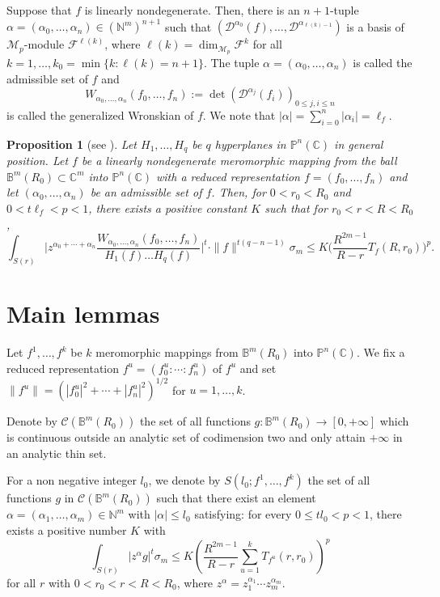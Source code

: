 \documentclass[12pt, a4paper, oneside]{amsart}
\newtheorem{proposition}[equation]{Proposition}
\newcommand{\C}{{\mathbb{C}}}
\newcommand{\N}{\mathbb{N}}
\newcommand{\B}{\mathbb{B}}
\renewcommand{\P}{{\mathbb{P}}}
\numberwithin{equation}{section}
\begin{document}
Suppose that $f$ is linearly nondegenerate. Then, there is an $n+1$-tuple $\alpha=(\alpha_0,\ldots,\alpha_n)\in (\mathbb N^m)^{n+1}$ such that $(\mathcal D^{\alpha_0}(f),\ldots,\mathcal D^{\alpha_{\ell (k)-1}})$ is a basis of $\mathcal M_p$-module $\mathcal F^{\ell (k)}$, where $\ell (k)=\dim_{\mathcal M_p}\mathcal F^{k}$ for all $k=1,\ldots,k_0=\min\{k:\ell (k)=n+1\}$. The tuple $\alpha=(\alpha_0,\ldots,\alpha_n)$ is called the admissible set of $f$ and 
$$W_{\alpha_0,\ldots ,\alpha_n}(f_0,\ldots ,f_n):=\det (\mathcal D^{\alpha_j}(f_i))_{0\le j,i\le n}$$ 
is called the generalized Wronskian of $f$. We note that $|\alpha|=\sum_{i=0}^n|\alpha_i|=\ell_f.$
\begin{proposition}[{see \cite[Proposition 2.12]{Fu86}}]\label{2.1}
 Let $H_1,\ldots ,H_q$ be $q$ hyperplanes in $\P^n(\C)$ in general position. Let $f$ be a linearly nondegenerate meromorphic mapping from the ball $\B^m(R_0)\subset\C^m$ into $\P^{n}(\C)$ with a reduced representation $f=(f_0,\ldots ,f_{n})$ and let $(\alpha_0,\ldots ,\alpha_n)$ be an admissible set of $f$. Then, for $0 < r_0 < R_0$ and $0< t\ell_f< p<1$,  there exists a positive constant $K$ such that for $r_0 < r < R < R_0$,
$$\int_{S(r)}\biggl |z^{\alpha_0+\cdots +\alpha_n}\dfrac{W_{\alpha_0,\ldots ,\alpha_n}(f_0,\ldots ,f_n)}{H_1(f)\ldots H_{q}(f)}\biggl |^t\cdot \|f\|^{t(q-n-1)}\sigma_m\le K\biggl (\dfrac{R^{2m-1}}{R-r}T_f(R,r_0)\biggl )^p.$$
\end{proposition}

\section{Main lemmas}
Let $f^1,\ldots,f^k$ be $k$ meromorphic mappings from $\B^m(R_0)$ into $\P^n(\C)$.
We fix a reduced representation $f^u=(f^u_0:\cdots :f^u_n)$ of $f^u$ and set $\|f^u\|=(|f^u_0|^2+\cdots+|f^u_n|^2)^{1/2}$ for $u=1,\ldots,k$.

Denote by $\mathcal C(\B^m(R_0))$ the set of all functions $g: \B^m(R_0)\to [0,+\infty]$ which is continuous outside an analytic set of codimension two and only attain $+\infty$ in an analytic thin set.

For a non negative integer $l_0$, we denote by $S(l_0;f^1,\ldots,f^k)$ the set of all functions $g$ in $\mathcal C(\B^m(R_0))$ such that there exist an element $\alpha=(\alpha_1,\ldots,\alpha_m)\in\N^m$ with $|\alpha|\le l_0$ satisfying: for every $0\le tl_0<p<1$, there exists a positive number $K$ with
$$\int_{S(r)}|z^\alpha g|^t\sigma_m \le K\left(\frac{R^{2m-1}}{R-r}\sum_{u=1}^kT_{f^u}(r,r_0)\right)^p$$
for all $r$ with $0<r_0<r<R<R_0$, where $z^\alpha=z_1^{\alpha_1}\cdots z_m^{\alpha_m}$. 
\end{document}
